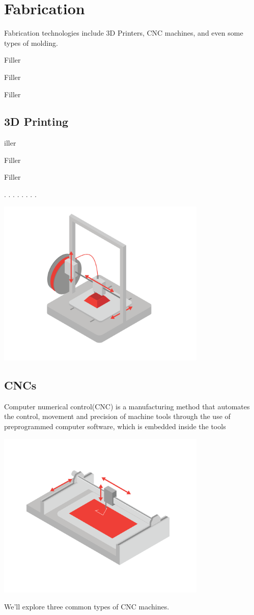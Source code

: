 \chapter{Fabrication}

Fabrication technologies include 3D Printers, CNC machines, and even some types of molding.

Filler


Filler

Filler

\section{3D Printing}
iller


Filler

Filler

.
.
.
.
.
.
.
.
\newpage

\includegraphics[width=0.75\textwidth]{3dprinter.png}


\section{CNCs}

Computer numerical control(CNC) is a manufacturing method that automates the control, movement and precision of machine tools through the use of preprogrammed computer software, which is embedded inside the tools

\includegraphics[width=0.75\textwidth]{cnc.png}

We'll explore three common types of CNC machines.





